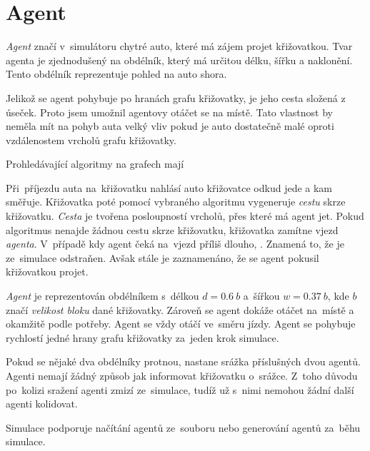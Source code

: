\section{Agent}\label{sec:agent}



\emph{Agent} značí v~simulátoru chytré auto, které má zájem projet křižovatkou.
Tvar agenta je zjednodušený na obdélník, který má určitou délku, šířku a naklonění.
Tento obdélník reprezentuje pohled na auto shora.

Jelikož se agent pohybuje po hranách grafu křižovatky, je jeho cesta složená z úseček.
Proto jsem umožnil agentovy otáčet se na místě.
Tato vlastnost by neměla mít na pohyb auta velký vliv pokud je auto dostatečně malé oproti vzdálenostem vrcholů grafu křižovatky.

Prohledávající algoritmy na grafech mají



Při~příjezdu auta na~křižovatku nahlásí auto křižovatce odkud jede a kam směřuje.
Křižovatka poté pomocí vybraného algoritmu vygeneruje \emph{cestu} skrze křižovatku.
\emph{Cesta} je tvořena posloupností vrcholů, přes které má agent jet.
Pokud algoritmus nenajde žádnou cestu skrze křižovatku, křižovatka zamítne vjezd \emph{agenta}.
V~případě kdy agent čeká na~vjezd příliš dlouho, .
Znamená to, že je ze~simulace odstraňen.
Avšak stále je zaznamenáno, že se agent pokusil křižovatkou projet.

\emph{Agent} je reprezentován obdélníkem s~délkou $d=0.6~b$ a~šířkou $w=0.37~b$,
kde $b$ značí \emph{velikost bloku} dané křižovatky.
Zároveň se agent dokáže otáčet na~místě a okamžitě podle potřeby.
Agent se vždy otáčí ve~směru jízdy.
Agent se pohybuje rychlostí jedné hrany grafu křižovatky za~jeden krok simulace.

Pokud se nějaké dva obdélníky protnou, nastane srážka příslušných dvou agentů.
Agenti nemají žádný způsob jak informovat křižovatku o~srážce.
Z~toho důvodu po~kolizi sražení agenti zmizí ze~simulace, tudíž už s~nimi nemohou žádní další agenti kolidovat.

Simulace podporuje načítání agentů ze~souboru nebo generování agentů za~běhu simulace.

